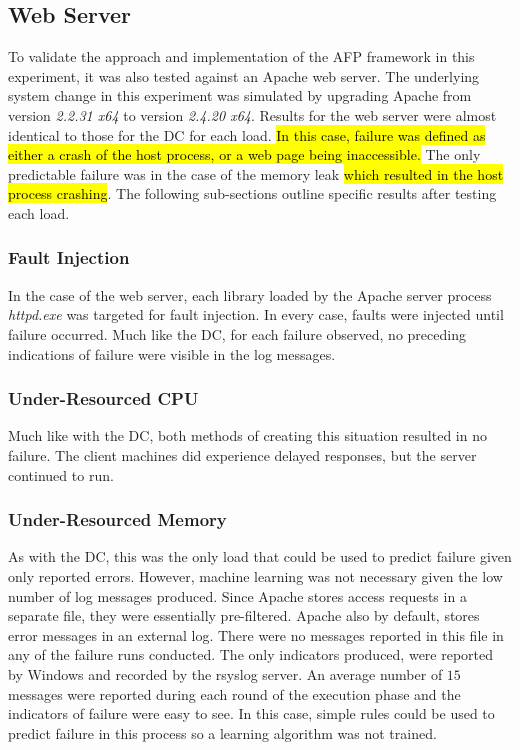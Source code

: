\subsection{Web Server}
To validate the approach and implementation of the \ac{AFP} framework in this
experiment, it was also tested against an Apache web server.  The underlying
system change in this experiment was simulated by upgrading Apache from version
\emph{2.2.31 x64} to version \emph{2.4.20 x64}.  Results for the web server
were almost identical to those for the \ac{DC} for each load.  \hl{In this
case, failure was defined as either a crash of the host process, or a web page
being inaccessible.}  The only predictable failure was in the case of the
memory leak \hl{which resulted in the host process crashing}.  The following
sub-sections outline specific results after testing each load.

\subsubsection{Fault Injection}
In the case of the web server, each library loaded by the Apache server process
\emph{httpd.exe} was targeted for fault injection.  In every case, faults were
injected until failure occurred.  Much like the \ac{DC}, for each failure
observed, no preceding indications of failure were visible in the log messages.

\subsubsection{Under-Resourced CPU}
Much like with the \ac{DC}, both methods of creating this situation resulted in
no failure.  The client machines did experience delayed responses, but the
server continued to run.

\subsubsection{Under-Resourced Memory}
As with the \ac{DC}, this was the only load that could be used to predict
failure given only reported errors.  However, machine learning was not
necessary given the low number of log messages produced.  Since Apache stores
access requests in a separate file, they were essentially pre-filtered.  Apache
also by default, stores error messages in an external log.  There were no
messages reported in this file in any of the failure runs conducted.  The only
indicators produced, were reported by Windows and recorded by the rsyslog
server.  An average number of $15$ messages were reported during each round of
the execution phase and the indicators of failure were easy to see.  In this
case, simple rules could be used to predict failure in this process so a
learning algorithm was not trained.  

